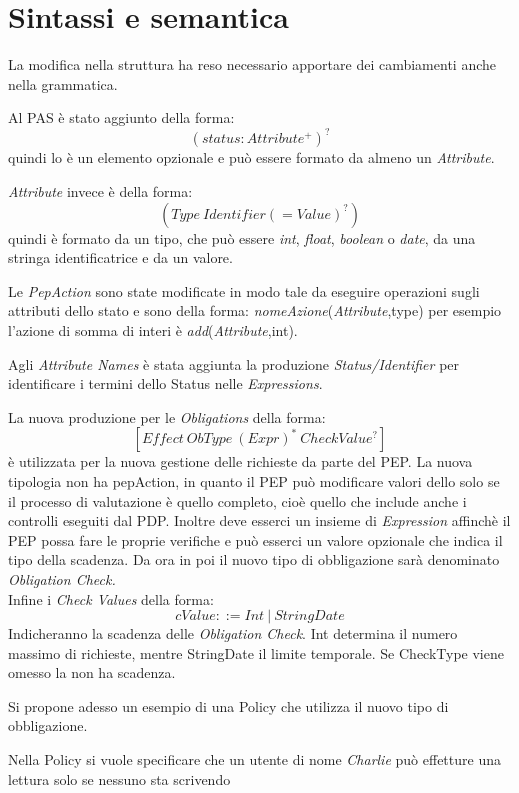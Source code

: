 \section{Sintassi e semantica}
\label{sec:Sintassi e semantica}
La modifica nella struttura ha reso necessario apportare dei cambiamenti anche nella grammatica.\par
Al PAS è stato aggiunto \status della forma:
$$(status: Attribute^+)^?$$
quindi lo \status è un elemento opzionale e può essere formato da almeno un \emph{ Attribute}.\\\par
\emph{ Attribute} invece è della forma:
$$(Type\ Identifier (= Value)^?)$$
quindi è formato da un tipo, che può essere \emph{int}, \emph{float}, \emph{boolean} o \emph{date}, da una stringa
identificatrice e da un valore.\par
Le \emph{PepAction} sono state modificate in modo tale da eseguire operazioni sugli attributi dello stato
e sono della forma: \emph{nomeAzione}(\emph{Attribute},type)
per esempio l'azione di somma di interi è \emph{add}(\emph{Attribute},int).\par
Agli \emph{Attribute Names} è stata aggiunta la produzione \textit{Status/Identifier} per identificare i
termini dello Status nelle \emph{Expressions}.\par
La nuova produzione per le \emph{Obligations} della forma:
$$[Effect\ ObType\ (Expr)^*\ CheckValue^?]$$
è utilizzata per la nuova gestione delle richieste da parte del PEP. La nuova tipologia
non ha pepAction, in quanto il PEP può modificare valori dello \status solo se il processo di valutazione è quello
completo, cioè quello che include anche i controlli eseguiti dal PDP. Inoltre deve esserci un insieme di \emph{Expression}
affinchè il PEP possa fare le proprie verifiche e può esserci un valore opzionale che indica il tipo della scadenza.
Da ora in poi il nuovo tipo di obbligazione sarà denominato \emph{Obligation Check.}\\
Infine i \emph{Check Values} della forma:
$$cValue ::= Int\ |\ StringDate$$
Indicheranno la scadenza delle \emph{Obligation Check}. Int determina il numero massimo di richieste, mentre StringDate
il limite temporale. Se CheckType viene omesso la \eobligation non ha scadenza.\par

Si propone adesso un esempio di una Policy che utilizza il nuovo tipo di obbligazione.\par
Nella Policy si vuole specificare che un utente di nome \emph{Charlie} può effetture una lettura solo se nessuno sta scrivendo
